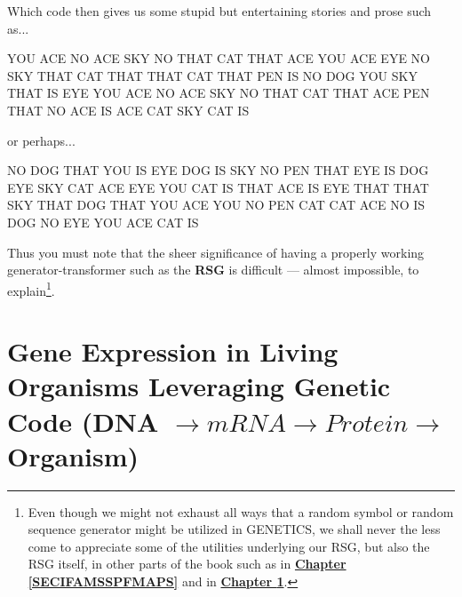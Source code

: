 \documentclass[a4paper, 18pt]{book} %
\begin{document}
\vspace{1em}


Which code then gives us some stupid but entertaining stories and prose such as...


    \vspace{1em}
  \begin{tcbverbatim}[title=Example 5: Random Prose based on RSG]
YOU ACE NO ACE SKY NO THAT CAT THAT ACE
YOU ACE EYE NO SKY THAT CAT THAT THAT CAT
THAT PEN IS NO DOG YOU SKY THAT IS EYE
YOU ACE NO ACE SKY NO THAT CAT THAT ACE
PEN THAT NO ACE IS ACE CAT SKY CAT IS
  \end{tcbverbatim}
  \vspace{1em}


or perhaps...



    \vspace{1em}
  \begin{tcbverbatim}[title=Example 6: Random Prose based on RSG]
NO DOG THAT YOU IS EYE DOG IS SKY NO
PEN THAT EYE IS DOG EYE SKY CAT ACE EYE
YOU CAT IS THAT ACE IS EYE THAT THAT SKY
THAT DOG THAT YOU ACE YOU NO PEN CAT CAT
ACE NO IS DOG NO EYE YOU ACE CAT IS
  \end{tcbverbatim}
  \vspace{1em}


Thus you must note that the sheer significance of having a properly working generator-transformer such as the \textbf{RSG} is difficult --- almost impossible, to explain\footnote{Even though we might not exhaust all ways that a random symbol or random sequence generator might be utilized in GENETICS, we shall never the less come to appreciate some of the utilities underlying our RSG, but also the RSG itself, in other parts of the book such as in \textbf{\hyperref[SECIFAMSSPFMAPS]{Chapter \ref{SECIFAMSSPFMAPS}}} and in \textbf{\hyperref[SEC05]{Chapter \ref{SEC05}}}.}. 







\chapter{Gene Expression in Living Organisms Leveraging Genetic Code (DNA $\rightarrow mRNA \rightarrow Protein \rightarrow$ Organism)}
\label{SEC05}
\end{document}
